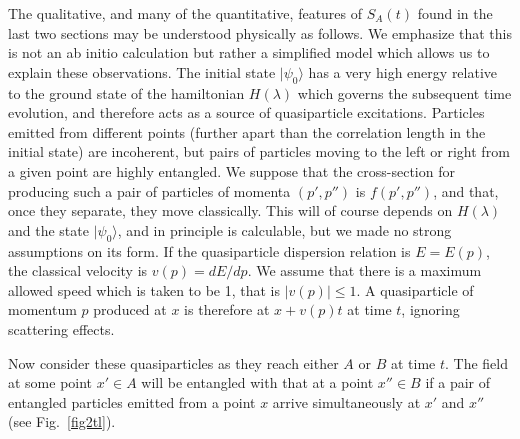 The qualitative, and many of the quantitative, features of $S_A(t)$
found in the last two sections may be understood physically as follows.
We emphasize that this is not an ab initio calculation but rather a
simplified model which allows us to explain these observations.
The initial state $|\psi_0\rangle$ has a very high energy relative to
the ground state of the hamiltonian $H(\lambda)$ which governs the 
subsequent time
evolution, and therefore acts as a source of quasiparticle excitations.
Particles emitted from different points (further apart than the
correlation length in the initial state) are incoherent, but pairs of
particles moving to the left or right from a given point are highly
entangled. We suppose that the cross-section for producing such a pair
of particles of momenta $(p',p'')$ is $f(p',p'')$, and that, once they
separate, they move classically. 
This will of course depends on $H(\lambda)$ and the state $|\psi_0\rangle$,
and in principle is calculable, but we made no strong assumptions on its
form. If the quasiparticle dispersion relation
is $E=E(p)$, the classical velocity is $v(p)=dE/dp$. We assume that
there is a maximum allowed speed which is taken to be 1, that is
$|v(p)|\leq 1$. A quasiparticle of momentum $p$ produced at $x$ is
therefore at $x+v(p)t$ at time $t$, ignoring scattering effects.

Now consider these quasiparticles as they reach either $A$ or $B$ at
time $t$. The field at some point $x'\in A$ will be entangled with that
at a point $x''\in B$ if a pair of entangled particles emitted from a
point $x$ arrive simultaneously at $x'$ and $x''$ (see Fig.~\ref{fig2tl}). 

